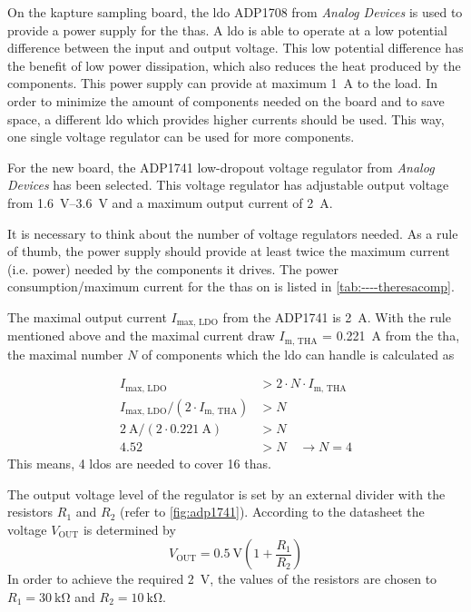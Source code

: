 On the \gls{kapture} sampling board, the \gls{ldo} ADP1708 from \textit{Analog Devices} is used to provide a power supply for the \glspl{tha}. 
A \gls{ldo} is able to operate at a low potential difference between the input and output voltage. 
This low potential difference has the benefit of low power dissipation, which also reduces the heat produced by the components.  
This power supply can provide at maximum \SI{1}{\ampere} to the load. 
In order to minimize the amount of components needed on the board and to save space, a different \gls{ldo} which provides higher currents should be used. 
This way, one single voltage regulator can be used for more components.

For the new board, the ADP1741 low-dropout voltage regulator from \textit{Analog Devices} has been selected. This voltage regulator has adjustable output voltage from \SIrange{1.6}{3.6}{\volt} and a maximum output current of \SI{2}{\ampere}. 

It is necessary to think about the number of voltage regulators needed. As a rule of thumb, the power supply should provide at least twice the maximum current (i.e. power) needed by the components it drives. \cite{michele} The power consumption/maximum current for the \glspl{tha} on is listed in \autoref{tab:----theresacomp}. 

The maximal output current $I_\text{max, LDO}$ from the ADP1741 is \SI{2}{\ampere}.
With the rule mentioned above and the maximal current draw $I_\text{m, THA}$ = \SI{0.221}{\ampere} from the \gls{tha}, the maximal number $N$ of components which the \gls{ldo} can handle is calculated as 

\begin{align*}
	I_\text{max, LDO} &> 2 \cdot N \cdot I_\text{m, THA} \\
	I_\text{max, LDO}/(2 \cdot I_\text{m, THA}) &> N \\
	\SI{2}{\ampere} / (2\cdot \SI{0.221}{\ampere}) &> N \\
	4.52 &> N \quad \rightarrow N = 4
\end{align*}
This means, 4 \glspl{ldo} are needed to cover 16 \glspl{tha}.

The output voltage level of the regulator is set by an external divider with the resistors $R_1$ and $R_2$ (refer to \autoref{fig:adp1741}). According to the datasheet \cite{adp1741} the voltage $V_\text{OUT}$ is determined by
\begin{equation}\label{eq:ldo}
	V_\text{OUT} = \SI{0.5}{\volt}\left(1 + \frac{R_1}{R_2} \right)
\end{equation}
In order to achieve the required \SI{2}{\volt}, the values of the resistors are chosen to $R_1 = \SI{30}{\kilo\ohm}$ and $R_2 = \SI{10}{\kilo \ohm}$. 

